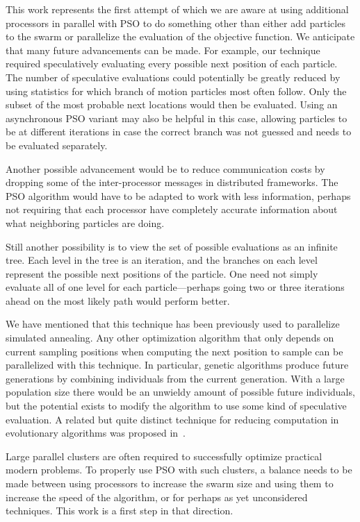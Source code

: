 \documentclass[letterpaper]{sig-alt-release2}
\begin{document}
This work represents the first attempt of which we are aware at using
additional processors in parallel with PSO to do something other than either
add particles to the swarm or parallelize the evaluation of the objective
function.  We anticipate that many future advancements can be made.  For
example, our technique required speculatively evaluating every possible next
position of each particle.  The number of speculative evaluations could
potentially be greatly reduced by using statistics for which branch of motion
particles most often follow.  Only the subset of the most probable next
locations would then be evaluated.  Using an asynchronous PSO variant may also
be helpful in this case, allowing particles to be at different iterations in
case the correct branch was not guessed and needs to be evaluated separately.

Another possible advancement would be to reduce communication costs by dropping
some of the inter-processor messages in distributed frameworks.  The PSO
algorithm would have to be adapted to work with less information, perhaps not
requiring that each processor have completely accurate information about what
neighboring particles are doing.

Still another possibility is to view the set of possible evaluations as an
infinite tree.  Each level in the tree is an iteration, and the branches on
each level represent the possible next positions of the particle.  One need not
simply evaluate all of one level for each particle---perhaps going two or three
iterations ahead on the most likely path would perform better.

We have mentioned that this technique has been previously used to parallelize
simulated annealing.  Any other optimization algorithm that only depends on 
current sampling positions when computing the next position to sample can be
parallelized with this technique.  In particular, genetic algorithms produce
future generations by combining individuals from the current generation.  With
a large population size there would be an unwieldy amount of possible future
individuals, but the potential exists to modify the algorithm to use some kind
of speculative evaluation.  A related but quite distinct technique for reducing
computation in evolutionary algorithms was proposed in~\cite{poli-ai06}.

Large parallel clusters are often required to successfully optimize practical
modern problems.  To properly use PSO with such clusters, a balance needs to be
made between using processors to increase the swarm size and using them to
increase the speed of the algorithm, or for perhaps as yet unconsidered
techniques.  This work is a first step in that direction.
\end{document}
